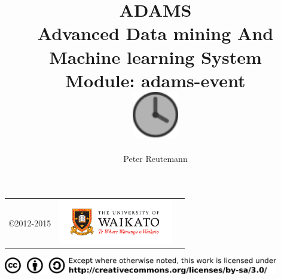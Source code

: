 \documentclass[a4paper]{book}
\title{
  \textbf{ADAMS} \\
  {\Large \textbf{A}dvanced \textbf{D}ata mining \textbf{A}nd \textbf{M}achine
  learning \textbf{S}ystem} \\
  {\Large Module: adams-event} \\
  \vspace{1cm}
  \includegraphics[width=2cm]{images/event-module.png} \\
}
\author{
  Peter Reutemann
}
\begin{document}
\begin{titlepage}
\maketitle

\thispagestyle{empty}
\center
\begin{table}[b]
	\begin{tabular}{c l l}
		\parbox[c][2cm]{2cm}{\copyright 2012-2015} &
		\parbox[c][2cm]{5cm}{\includegraphics[width=5cm]{images/coat_of_arms.pdf}} \\
	\end{tabular}
	\includegraphics[width=12cm]{images/cc.png} \\
\end{table}

\end{titlepage}

\tableofcontents
\listoffigures

\end{document}

